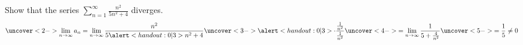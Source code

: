 \begin{frame}
\begin{example}[Example 8, p. 728]
Show that the series $\sum_{n=1}^\infty \frac{n^2}{5n^2+4}$ diverges.
\[
\uncover<2->{%
\lim_{n\to\infty} a_n = \lim_{n\to\infty} \frac{n^2}{5\alert<handout:0| 3>{n^2}+4}\uncover<3->{\alert<handout:0| 3>{\cdot \frac{\frac{1}{n^2}}{\frac{1}{n^2}}}}%
}%
\uncover<4->{%
 = \lim_{n\to\infty} \frac{1}{5+\frac{4}{n^2}} %
}%
\uncover<5->{%
 = \frac{1}{5} \neq 0%
}%
\]
%
\end{example}
\end{frame}
